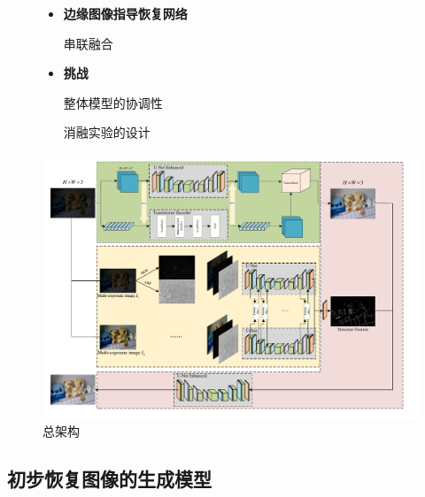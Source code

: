 \documentclass[CJK,aspectratio=169]{beamer}  %
\begin{document}
\begin{frame}
\begin{figure}
\begin{minipage}{.4\columnwidth}
\begin{itemize}
					{ 多曝光架构}
					
					{ 融合HOG和LBP图像}
					
					
					\item \textbf{边缘图像指导恢复网络}
					
					{ 串联融合}
					
					\item \textbf{挑战}
					
					{ 整体模型的协调性}
					
					{ 消融实验的设计}
				\end{itemize}
			\end{minipage}
			\begin{minipage}{.58\columnwidth}
				\setlength{\abovecaptionskip}{-0.05cm}
				\centering 
				\includegraphics[width=\textwidth]{picture/LLIE/My Architecture/Total architecture}
				\captionsetup{font=scriptsize}
				\caption{
					\label{fig: Total architecture}
					总架构
				}
			\end{minipage}
		\end{figure}
		
	\end{frame}
	
	
	\subsection{初步恢复图像的生成模型}
	
\end{document}
